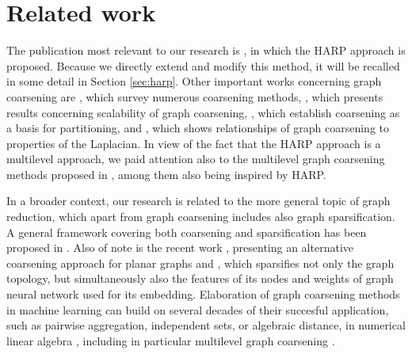 \section{Related work}

The publication most relevant to our research is \cite{chen_harp_2018}, in which the HARP approach is proposed. Because we directly extend and modify this method, it will be recalled in some detail in Section \ref{sec:harp}. Other important works concerning graph coarsening are \cite{akyildiz_understanding_2020,chen_graph_2022,cai_graph_2022}, which survey numerous coarsening methods, \cite{huang_scaling_2021}, which presents results concerning scalability of graph coarsening, \cite{catalyurek_multithreaded_2012,herrmann_multilevel_2019}, which establish coarsening as a basis for partitioning, and \cite{loukas_graph_2019}, which shows relationships of graph coarsening to properties of the Laplacian. In view of the fact that the HARP approach is a multilevel approach, we paid attention also to the multilevel graph coarsening methods proposed in \cite{bethune_hierarchical_2020,xie_graph_2020,zhang_harp_2021,liu_hierarchical_2021}, among them \cite{zhang_harp_2021} also being inspired by HARP.

In a broader context, our research is related to the more general topic of graph reduction, which apart from graph coarsening includes also graph sparsification. A general framework covering both coarsening and sparsification has been proposed in \cite{bravo_hermsdorff_unifying_2019}. Also of note is the recent work \cite{kammer_space-efficient_2022}, presenting an alternative coarsening approach for planar graphs and \cite{liu_comprehensive_2022}, which sparsifies not only the graph topology, but simultaneously also the features of its nodes and weights of graph neural network used for its embedding. Elaboration of graph coarsening methods in machine learning can build on several decades of their succesful application, such as pairwise aggregation, independent sets, or algebraic distance, in numerical linear algebra \cite{chen_graph_2022}, including in particular multilevel graph coarsening \cite{osei-kuffuor_matrix_2015,ubaru_sampling_2019}.
